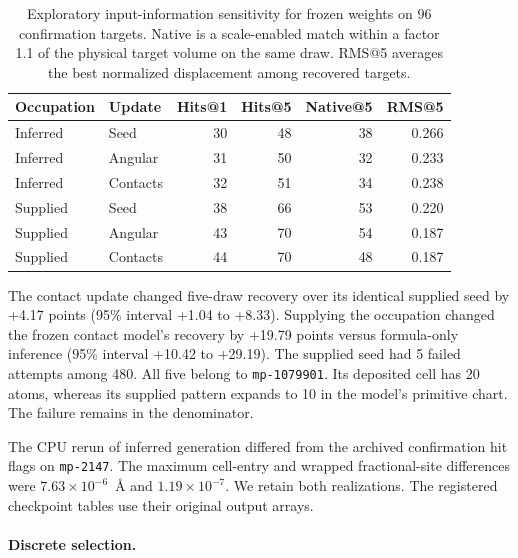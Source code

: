 \begin{table}[htbp]\centering\small\setlength{\tabcolsep}{4pt}
\caption{Exploratory input-information sensitivity for frozen weights on 96 confirmation targets. Native is a scale-enabled match within a factor 1.1 of the physical target volume on the same draw. RMS@5 averages the best normalized displacement among recovered targets.}\label{tab:supplied-confirm}
\begin{tabular}{llrrrr}\hline
Occupation & Update & Hits@1 & Hits@5 & Native@5 & RMS@5\\\hline

Inferred & Seed & 30 & 48 & 38 & 0.266\\

Inferred & Angular & 31 & 50 & 32 & 0.233\\

Inferred & Contacts & 32 & 51 & 34 & 0.238\\

Supplied & Seed & 38 & 66 & 53 & 0.220\\

Supplied & Angular & 43 & 70 & 54 & 0.187\\

Supplied & Contacts & 44 & 70 & 48 & 0.187\\

\hline\end{tabular}\end{table}

The contact update changed five-draw recovery over its identical supplied seed by +4.17 points (95\% interval +1.04 to +8.33). Supplying the occupation changed the frozen contact model's recovery by +19.79 points versus formula-only inference (95\% interval +10.42 to +29.19). The supplied seed had 5 failed attempts among 480. All five belong to \texttt{mp-1079901}. Its deposited cell has 20 atoms, whereas its supplied pattern expands to 10 in the model's primitive chart. The failure remains in the denominator.

The CPU rerun of inferred generation differed from the archived confirmation hit flags on \texttt{mp-2147}. The maximum cell-entry and wrapped fractional-site differences were \(7.63\times10^{-6}\)~\AA{} and \(1.19\times10^{-7}\). We retain both realizations. The registered checkpoint tables use their original output arrays.

\paragraph{Discrete selection.}

